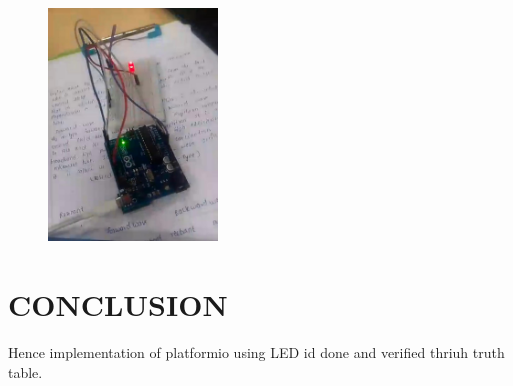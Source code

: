 \documentclass[conference]{IEEEtran}                   \IEEEoverridecommandlockouts
\begin{document}
\begin{figure}[h]
	\centering
	\includegraphics[width=0.4\textwidth]{2.jpg}
	\caption{\label{fig-5:Gates}}
\end{figure}
\section{CONCLUSION}
Hence implementation of platformio using LED id done and verified thriuh truth table.
\end{document}
